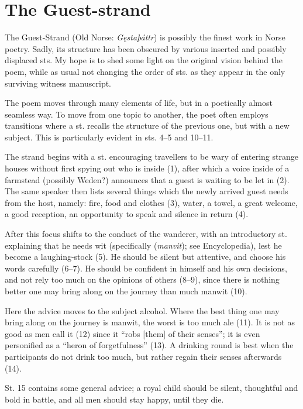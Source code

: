 \section{The Guest-strand}

The Guest-Strand (Old Norse: \emph{Gęstaþáttr}) is possibly the finest work in Norse poetry. Sadly, its structure has been obscured by various inserted and possibly displaced sts. My hope is to shed some light on the original vision behind the poem, while as usual not changing the order of sts. as they appear in the only surviving witness manuscript.

The poem moves through many elements of life, but in a poetically almost seamless way. To move from one topic to another, the poet often employs transitions where a st. recalls the structure of the previous one, but with a new subject. This is particularly evident in sts. 4–5 and 10–11.

The strand begins with a st. encouraging travellers to be wary of entering strange houses without first spying out who is inside (1), after which a voice inside of a farmstead (possibly Weden?) announces that a guest is waiting to be let in (2). The same speaker then lists several things which the newly arrived guest needs from the host, namely: fire, food and clothes (3), water, a towel, a great welcome, a good reception, an opportunity to speak and silence in return (4).

After this focus shifts to the conduct of the wanderer, with an introductory st. explaining that he needs wit (specifically  (\emph{manvit}); see Encyclopedia), lest he become a laughing-stock (5). He should be silent but attentive, and choose his words carefully (6–7). He should be confident in himself and his own decisions, and not rely too much on the opinions of others (8–9), since there is nothing better one may bring along on the journey than much manwit (10).

Here the advice moves to the subject alcohol. Where the best thing one may bring along on the journey is manwit, the worst is too much ale (11). It is not as good as men call it (12) since it “robs [them] of their senses”; it is even personified as a “heron of forgetfulness” (13). A drinking round is best when the participants do not drink too much, but rather regain their senses afterwards (14).

St. 15 contains some general advice; a royal child should be silent, thoughtful and bold in battle, and all men should stay happy, until they die.

